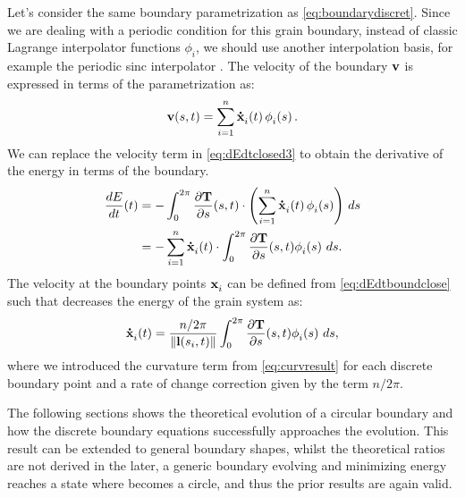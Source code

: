 Let's consider the same boundary parametrization as \eqref{eq:boundarydiscret}. Since we are dealing with a periodic condition for this grain boundary, instead of classic Lagrange interpolator functions $\phi_i$, we should use another interpolation basis, for example the periodic sinc interpolator \cite{trefethen2000spectral}. The velocity of the boundary $\mathbf{v}$ is expressed in terms of the parametrization as:
\begin{equation}
    \vel(s,t) = \velboundary.
\end{equation}
We can replace the velocity term in \eqref{eq:dEdtclosed3} to obtain the derivative of the energy in terms of the boundary.
\begin{align}
    \dfrac{dE}{dt}(t)
    &= -\int_0^{2\pi} \dTds(s,t) \cdot \left( \velboundary \right)\, ds \nonumber \\
    &= -\sum_{i=1}^{n}  \dotx[i](t) \cdot \int_0^{2\pi}  \dTds(s,t) \phii{i}{s}\, ds.
    \label{eq:dEdtboundclose}
\end{align}
The velocity at the boundary points $\x[i]$ can be defined from \eqref{eq:dEdtboundclose} such that decreases the energy of the grain system as:
\begin{equation}
    \dotx[i](t)= \frac{n/2\pi}{\norm{\mylvec(s_i,t)}} \int_0^{2\pi}  \dTds(s,t) \phii{i}{s}\, ds,
\end{equation}
where we introduced the curvature term from \eqref{eq:curvresult} for each discrete boundary point and a rate of change correction given by the term $n/2\pi$.

The following sections shows the theoretical evolution of a circular boundary and how the discrete boundary equations successfully approaches the evolution. This result can be extended to general boundary shapes, whilst the theoretical ratios are not derived in the later, a generic boundary evolving and minimizing energy reaches a state where becomes a circle, and thus the prior results are again valid.

